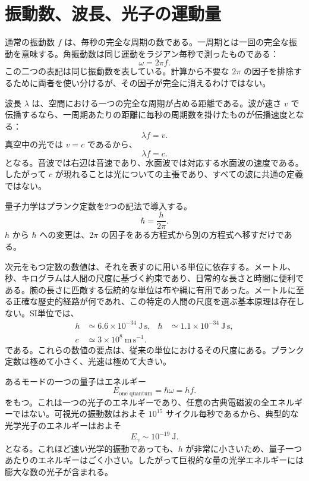 \section{振動数、波長、光子の運動量}

通常の振動数 \(f\) は、毎秒の完全な周期の数である。一周期とは一回の完全な振動を意味する。角振動数は同じ運動をラジアン毎秒で測ったものである：
\begin{equation}
\omega=2\pi f.
\end{equation}
この二つの表記は同じ振動数を表している。計算から不要な \(2\pi\) の因子を排除するために両者を使い分けるが、その因子が完全に消えるわけではない。

波長 \(\lambda\) は、空間における一つの完全な周期が占める距離である。波が速さ \(v\) で伝播するなら、一周期あたりの距離に毎秒の周期数を掛けたものが伝播速度となる：
\begin{equation}
\lambda f=v.
\end{equation}
真空中の光では \(v=c\) であるから、
\begin{equation}
\lambda f=c.
\end{equation}
となる。音波では右辺は音速であり、水面波では対応する水面波の速度である。したがって \(c\) が現れることは光についての主張であり、すべての波に共通の定義ではない。

量子力学はプランク定数を2つの記法で導入する。
\begin{equation}
\hbar=\frac{h}{2\pi}.
\end{equation}
\(h\) から \(\hbar\) への変更は、\(2\pi\) の因子をある方程式から別の方程式へ移すだけである。

次元をもつ定数の数値は、それを表すのに用いる単位に依存する。メートル、秒、キログラムは人間の尺度に基づく約束であり、日常的な長さと時間に便利である。腕の長さに匹敵する伝統的な単位は布や縄に有用であった。メートルに至る正確な歴史的経路が何であれ、この特定の人間の尺度を選ぶ基本原理は存在しない。SI単位では、
\begin{equation}
\begin{aligned}
h &\simeq 6.6\times10^{-34}\ \mathrm{J\,s},
&\hbar &\simeq 1.1\times10^{-34}\ \mathrm{J\,s},\\
c &\simeq 3\times10^8\ \mathrm{m\,s^{-1}}.
\end{aligned}
\end{equation}
である。これらの数値の要点は、従来の単位におけるその尺度にある。プランク定数は極めて小さく、光速は極めて大きい。

あるモードの一つの量子はエネルギー
\begin{equation}
E_{\text{one quantum}}=\hbar\omega=hf.
\end{equation}
をもつ。これは一つの光子のエネルギーであり、任意の古典電磁波の全エネルギーではない。可視光の振動数はおよそ \(10^{15}\) サイクル毎秒であるから、典型的な光学光子のエネルギーはおよそ
\begin{equation}
E_\gamma\sim 10^{-19}\ \mathrm{J}.
\end{equation}
となる。これほど速い光学的振動であっても、\(h\) が非常に小さいため、量子一つあたりのエネルギーはごく小さい。したがって巨視的な量の光学エネルギーには膨大な数の光子が含まれる。

